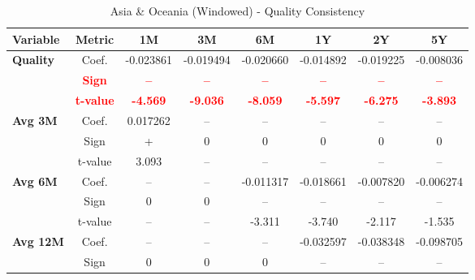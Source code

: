\documentclass[11pt,english,a4paper,hidelinks]{book}
\begin{document}
\begin{table}[H]
    \centering
    \caption{Asia \& Oceania (Windowed) - Quality Consistency}
    \begin{tabular}{lccccccc}
        \toprule
        \textbf{Variable} & \textbf{Metric} & \textbf{1M} & \textbf{3M} & \textbf{6M} & \textbf{1Y} & \textbf{2Y} & \textbf{5Y} \\
        \midrule
        \multirow{3}{*}{\textbf{Quality}}
            & Coef.   & -0.023861 & -0.019494 & -0.020660 & -0.014892 & -0.019225 & -0.008036 \\
            & \textbf{\textcolor{red}{Sign}}
                     & \textbf{\textcolor{red}{–}}
                     & \textbf{\textcolor{red}{–}}
                     & \textbf{\textcolor{red}{–}}
                     & \textbf{\textcolor{red}{–}}
                     & \textbf{\textcolor{red}{–}}
                     & \textbf{\textcolor{red}{–}} \\
            & \textbf{\textcolor{red}{t-value}}
                     & \textbf{\textcolor{red}{-4.569}}
                     & \textbf{\textcolor{red}{-9.036}}
                     & \textbf{\textcolor{red}{-8.059}}
                     & \textbf{\textcolor{red}{-5.597}}
                     & \textbf{\textcolor{red}{-6.275}}
                     & \textbf{\textcolor{red}{-3.893}} \\
        \cmidrule{1-8}
        \multirow{3}{*}{\textbf{Avg 3M}}
            & Coef.   & 0.017262  & --        & --        & --        & --        & --        \\
            & Sign    & +         & 0         & 0         & 0         & 0         & 0         \\
            & t-value & 3.093     & --        & --        & --        & --        & --        \\
        \cmidrule{1-8}
        \multirow{3}{*}{\textbf{Avg 6M}}
            & Coef.   & --        & --        & -0.011317 & -0.018661 & -0.007820 & -0.006274 \\
            & Sign    & 0         & 0         & –         & –         & –         & –         \\
            & t-value & --        & --        & -3.311    & -3.740    & -2.117    & -1.535    \\
        \cmidrule{1-8}
        \multirow{3}{*}{\textbf{Avg 12M}}
            & Coef.   & --        & --        & --        & -0.032597 & -0.038348 & -0.098705 \\
            & Sign    & 0   & 0   & 0   & –   & –   & –   \\

\end{tabular}
\end{table}
\end{document}
